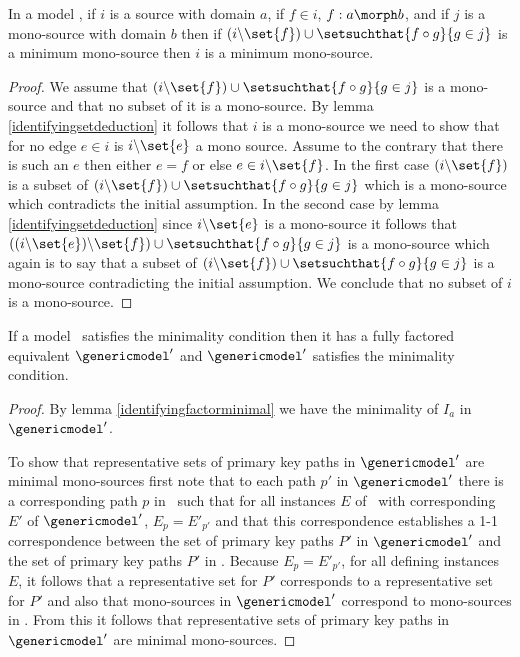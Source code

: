\begin{lemma}
\label{identifyingfactorminimal}
In a model \genericmodel, if $i$ is a source with domain $a$,
if $f \in i$, $f: a \morph b$, 
and if $j$ is a mono-source with domain $b$
then  if $(i \backslash \set{f}) \cup \setsuchthat{f \circ g}{g \in j}$ is a minimum mono-source
then $i$ is a minimum mono-source.
\end{lemma}
\begin{proof}
We assume that $(i \backslash \set{f}) \cup \setsuchthat{f \circ g}{g \in j}$ is a mono-source and that no subset of it is a mono-source.
By lemma \ref{identifyingsetdeduction} it follows that $i$ is a mono-source we need to show that
for no edge $e \in i$ is $i \backslash \set{e}$ a mono source. Assume to the contrary that there is such an $e$ then  either $e = f$ or else
$e \in i \backslash \set{f}$. In the first case $(i \backslash \set{f})$ is a subset of  $(i \backslash \set{f}) \cup \setsuchthat{f \circ g}{g \in j}$ which is a mono-source which contradicts the initial assumption. In the second  case 
by lemma \ref{identifyingsetdeduction} since $i \backslash \set{e}$ is a mono-source it follows that
$((i \backslash \set{e})\backslash \set{f}) \cup \setsuchthat{f \circ g}{g \in j}$ is a mono-source which again is to say that a subset
of $(i \backslash \set{f}) \cup \setsuchthat{f \circ g}{g \in j}$ is a mono-source contradicting the initial assumption.
We conclude that no subset of $i$ is a mono-source.
\end{proof}

\begin{lemma}
If a model \genericmodel\ satisfies the minimality condition then it has a fully factored
equivalent $\genericmodel'$  and $\genericmodel'$ satisfies the minimality condition. 
\end{lemma}
\begin{proof}
By lemma \ref{identifyingfactorminimal} we have the minimality of $I_a$ in $\genericmodel'$.

To show that representative sets of primary key paths in $\genericmodel'$ are minimal mono-sources
first note that to each path $p'$ in $\genericmodel'$ there is a corresponding path 
$p$ in \genericmodel\  
 such that for all instances $E$ of \genericmodel\ with corresponding $E'$ of $\genericmodel'$, 
$E_p=E'_{p'}$ and that this correspondence establishes a 1-1 correspondence between the set of primary key paths $P'$ in $\genericmodel'$
and the set of primary key paths $P'$ in \genericmodel. Because $E_p=E'_{p'}$, for all defining instances
$E$, it follows that a representative set for $P'$ corresponds to a representative set for $P'$ and also
that mono-sources in $\genericmodel'$ correspond to mono-sources in \genericmodel. From this it follows that representative sets of primary key paths in $\genericmodel'$ are minimal mono-sources.
\end{proof}
